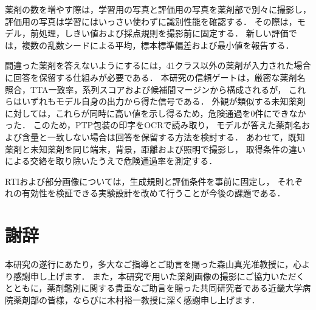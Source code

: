 \documentclass[uplatex,dvipdfmx]{jsarticle}
\begin{document}
薬剤の数を増やす際は，学習用の写真と評価用の写真を薬剤部で別々に撮影し，
評価用の写真は学習にはいっさい使わずに識別性能を確認する．
その際は，モデル，前処理，しきい値および採点規則を撮影前に固定する．
新しい評価では，複数の乱数シードによる平均，標本標準偏差および最小値を報告する．

間違った薬剤を答えないようにするには，41クラス以外の薬剤が入力された場合に回答を保留する仕組みが必要である．
本研究の信頼ゲートは，厳密な薬剤名照合，TTA一致率，系列スコアおよび候補間マージンから構成されるが，
これらはいずれもモデル自身の出力から得た信号である．
外観が類似する未知薬剤に対しては，これらが同時に高い値を示し得るため，危険通過を0件にできなかった．
このため，PTP包装の印字をOCRで読み取り，
モデルが答えた薬剤名および含量と一致しない場合は回答を保留する方法を検討する．
あわせて，既知薬剤と未知薬剤を同じ端末，背景，距離および照明で撮影し，
取得条件の違いによる交絡を取り除いたうえで危険通過率を測定する．

RTIおよび部分画像については，生成規則と評価条件を事前に固定し，
それぞれの有効性を検証できる実験設計を改めて行うことが今後の課題である．

\clearpage

\section*{謝辞}

本研究の遂行にあたり，多大なご指導とご助言を賜った森山真光准教授に，心より感謝申し上げます．
また，本研究で用いた薬剤画像の撮影にご協力いただくとともに，薬剤鑑別に関する貴重なご助言を賜った共同研究者である近畿大学病院薬剤部の皆様，ならびに木村裕一教授に深く感謝申し上げます．

\clearpage
{}

{\raggedright


}
\end{document}
